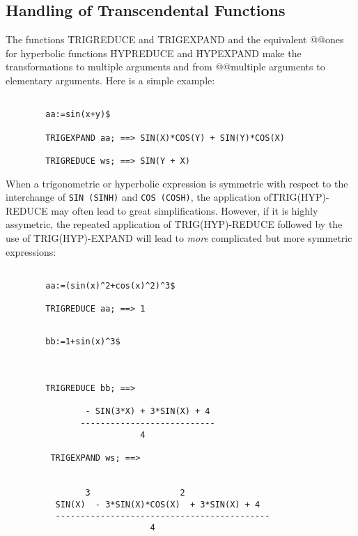 \subsection{Handling of Transcendental Functions}
The functions \f{TRIGREDUCE} and \f{TRIGEXPAND} and the equivalent
@@ones for hyperbolic functions \f{HYPREDUCE} and \f{HYPEXPAND}
make the transformations to multiple arguments and from
@@multiple arguments to elementary arguments. Here is a simple example:
\begin{verbatim}

        aa:=sin(x+y)$

        TRIGEXPAND aa; ==> SIN(X)*COS(Y) + SIN(Y)*COS(X)

        TRIGREDUCE ws; ==> SIN(Y + X)

\end{verbatim}
When a trigonometric or hyperbolic expression is symmetric with
respect to the interchange of {\tt SIN (SINH)} and {\tt COS (COSH)},
the application of\linebreak \f{TRIG(HYP)-REDUCE} may often lead to great
simplifications. However, if it is highly assymetric, the repeated
application of \f{TRIG(HYP)-REDUCE} followed by the use of
\f{TRIG(HYP)-EXPAND} will lead to {\em more} complicated
but more symmetric expressions:
\begin{verbatim}

        aa:=(sin(x)^2+cos(x)^2)^3$

        TRIGREDUCE aa; ==> 1

\end{verbatim}
\begin{verbatim}

        bb:=1+sin(x)^3$



        TRIGREDUCE bb; ==>

                - SIN(3*X) + 3*SIN(X) + 4
               ---------------------------
                           4

         TRIGEXPAND ws; ==>


                3                  2
          SIN(X)  - 3*SIN(X)*COS(X)  + 3*SIN(X) + 4
          -------------------------------------------
                             4

\end{verbatim}
